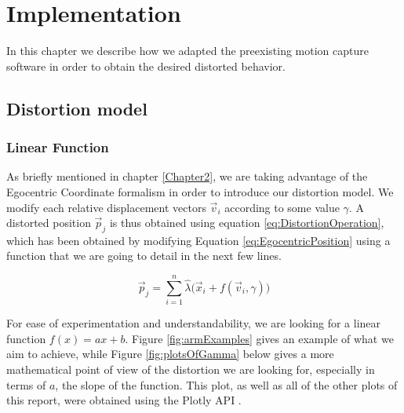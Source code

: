 
\chapter{Implementation} %

\label{Chapter3} %

In this chapter we describe how we adapted the preexisting motion capture software in order to obtain the desired distorted behavior.

\section{Distortion model}

\subsection*{Linear Function}

As briefly mentioned in chapter \ref{Chapter2}, we are taking advantage of the Egocentric Coordinate formalism in order to introduce our distortion model. We modify each relative displacement vectors $\vec{v}_i$ according to some value $\gamma$. A distorted position $\vec{p}_j$ is thus obtained using equation \ref{eq:DistortionOperation}, which has been obtained by modifying Equation \ref{eq:EgocentricPosition} using a function that we are going to detail in the next few lines.

\begin{equation}
\label{eq:DistortionOperation}
\vec{p}_j = \displaystyle\sum_{i=1}^{n} \hat{\lambda}\big(\vec{x}_i + f(\vec{v}_i,\gamma )\big)
\end{equation}

\noindent
For ease of experimentation and understandability, we are looking for a linear function $f(x) = ax + b$. Figure \ref{fig:armExamples} gives an example of what we aim to achieve, while Figure \ref{fig:plotsOfGamma} below gives a more mathematical point of view of the distortion we are looking for, especially in terms of $a$, the slope of the function. This plot, as well as all of the other plots of this report, were obtained using the Plotly API \cite{plotly}.

